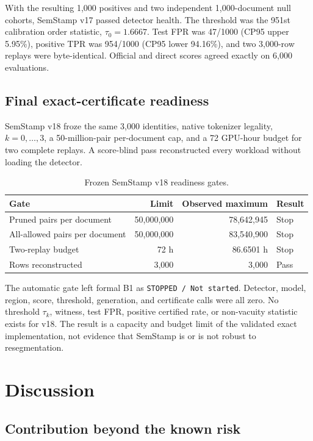 \documentclass[10pt]{article}
\begin{document}
With the resulting 1,000 positives and two independent 1,000-document null
cohorts, SemStamp v17 passed detector health. The threshold was the 951st
calibration order statistic, $\tau_0=1.6667$. Test FPR was 47/1000
(CP95 upper 5.95\%), positive TPR was 954/1000 (CP95 lower 94.16\%), and two
3,000-row replays were byte-identical. Official and direct scores agreed
exactly on 6,000 evaluations.

\subsection{Final exact-certificate readiness}

SemStamp v18 froze the same 3,000 identities, native tokenizer legality,
$k=0,\ldots,3$, a 50-million-pair per-document cap, and a 72 GPU-hour budget
for two complete replays. A score-blind pass reconstructed every workload
without loading the detector.

\begin{table}[t]
\caption{Frozen SemStamp v18 readiness gates.}
\label{tab:v18}
\centering
\begin{tabular}{lrrl}
\toprule
Gate & Limit & Observed maximum & Result \\
\midrule
Pruned pairs per document & 50,000,000 & 78,642,945 & Stop \\
All-allowed pairs per document & 50,000,000 & 83,540,900 & Stop \\
Two-replay budget & 72 h & 86.6501 h & Stop \\
Rows reconstructed & 3,000 & 3,000 & Pass \\
\bottomrule
\end{tabular}
\end{table}

The automatic gate left formal B1 as \texttt{STOPPED / Not started}.
Detector, model, region, score, threshold, generation, and certificate calls
were all zero. No threshold $\tau_k$, witness, test FPR, positive certified
rate, or non-vacuity statistic exists for v18. The result is a capacity and
budget limit of the validated exact implementation, not evidence that
SemStamp is or is not robust to resegmentation.

\section{Discussion}

\subsection{Contribution beyond the known risk}
\end{document}
